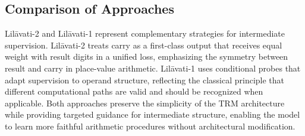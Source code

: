 \subsection{Comparison of Approaches}
Lil\={a}vati-2 and Lil\={a}vati-1 represent complementary strategies for intermediate supervision. Lil\={a}vati-2 treats carry as a first-class output that receives equal weight with result digits in a unified loss, emphasizing the symmetry between result and carry in place-value arithmetic. Lil\={a}vati-1 uses conditional probes that adapt supervision to operand structure, reflecting the classical principle that different computational paths are valid and should be recognized when applicable. Both approaches preserve the simplicity of the TRM architecture while providing targeted guidance for intermediate structure, enabling the model to learn more faithful arithmetic procedures without architectural modification.
